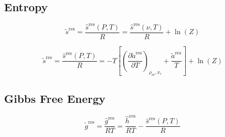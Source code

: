 \documentclass[12pt, letterpaper]{article}
\begin{document}
\subsection{Entropy}


\begin{equation}
    \tilde{s}^{\mathrm{res}} = \frac{\hat{s}^{\mathrm{res}}(P,T)}{R}=\frac{\hat{s}^{\mathrm{res}}(\nu,T)}{R}+\ln(Z)
    \label{eq:s_res_from_s_vol}
\end{equation}


\begin{equation}
    \tilde{s}^{\mathrm{res}} = \frac{\hat{s}^{\mathrm{res}}(P,T)}{R}=-T\left[\left(\frac{\partial\tilde{a}^{\mathrm{res}}}{\partial T}\right)_{\rho_m,x_{i}}+\frac{\tilde{a}^{\mathrm{res}}}{T}\right]+\ln(Z)
    \label{eq:s_res}
\end{equation}

\subsection{Gibbs Free Energy}


\begin{equation}
    \tilde{g}^{\mathrm{res}}=\frac{\hat{g}^{\mathrm{res}}}{RT}=\frac{\hat{h}^{\mathrm{res}}}{RT}-\frac{\hat{s}^{\mathrm{res}}(P,T)}{R}
    \label{eq:g_res_from_hs}
\end{equation}

\end{document}
